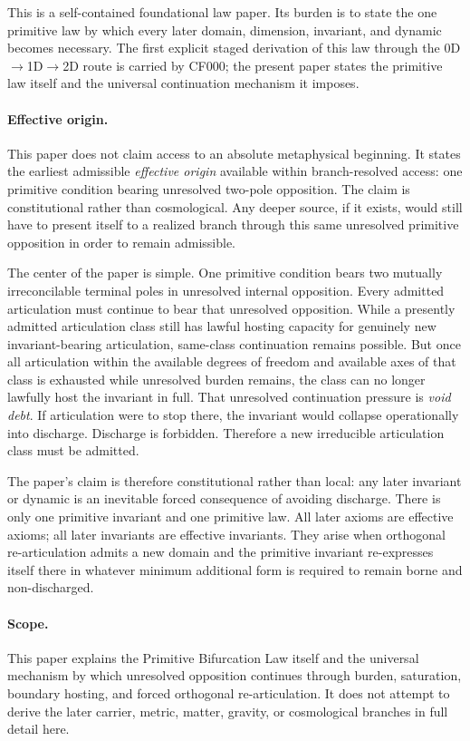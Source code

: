 \documentclass[11pt]{article}
\theoremstyle{definition}
\theoremstyle{plain}
\theoremstyle{remark}
\begin{document}
This is a self-contained foundational law paper. Its burden is to state the one primitive law by which every later domain, dimension, invariant, and dynamic becomes necessary. The first explicit staged derivation of this law through the 0D$\to$1D$\to$2D route is carried by CF000; the present paper states the primitive law itself and the universal continuation mechanism it imposes.

\paragraph{Effective origin.}
This paper does not claim access to an absolute metaphysical beginning. It states the earliest admissible \emph{effective origin} available within branch-resolved access: one primitive condition bearing unresolved two-pole opposition. The claim is constitutional rather than cosmological. Any deeper source, if it exists, would still have to present itself to a realized branch through this same unresolved primitive opposition in order to remain admissible.

The center of the paper is simple. One primitive condition bears two mutually irreconcilable terminal poles in unresolved internal opposition. Every admitted articulation must continue to bear that unresolved opposition. While a presently admitted articulation class still has lawful hosting capacity for genuinely new invariant-bearing articulation, same-class continuation remains possible. But once all articulation within the available degrees of freedom and available axes of that class is exhausted while unresolved burden remains, the class can no longer lawfully host the invariant in full. That unresolved continuation pressure is \emph{void debt}. If articulation were to stop there, the invariant would collapse operationally into discharge. Discharge is forbidden. Therefore a new irreducible articulation class must be admitted.

The paper's claim is therefore constitutional rather than local: any later invariant or dynamic is an inevitable forced consequence of avoiding discharge. There is only one primitive invariant and one primitive law. All later axioms are effective axioms; all later invariants are effective invariants. They arise when orthogonal re-articulation admits a new domain and the primitive invariant re-expresses itself there in whatever minimum additional form is required to remain borne and non-discharged.

\paragraph{Scope.} This paper explains the Primitive Bifurcation Law itself and the universal mechanism by which unresolved opposition continues through burden, saturation, boundary hosting, and forced orthogonal re-articulation. It does not attempt to derive the later carrier, metric, matter, gravity, or cosmological branches in full detail here.
\end{document}
